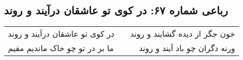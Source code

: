 \begin{center}
\section*{رباعی شماره ۶۷: در کوی تو عاشقان درآیند و روند}
\label{sec:067}
\begin{longtable}{l p{0.5cm} r}
در کوی تو عاشقان درآیند و روند
&&
خون جگر از دیده گشایند و روند
\\
ما بر در تو چو خاک ماندیم مقیم
&&
ورنه دگران چو باد آیند و روند
\\
\end{longtable}
\end{center}

